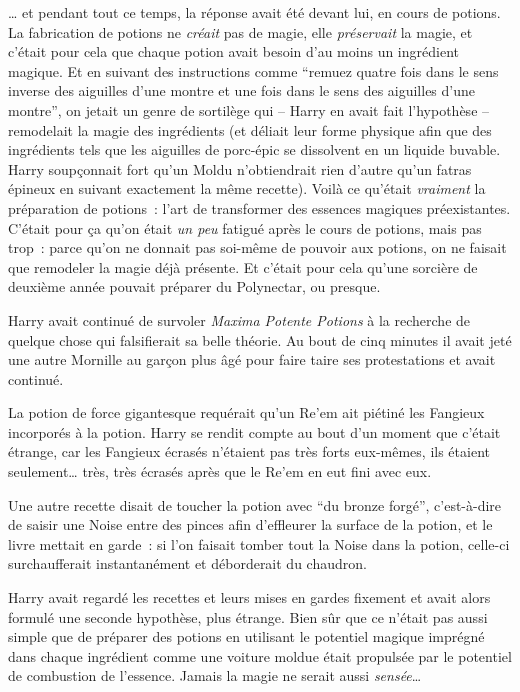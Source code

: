 … et pendant tout ce temps, la réponse avait été devant lui, en cours de potions.
La fabrication de potions ne \emph{créait} pas de magie, elle \emph{préservait} la magie, et c'était pour cela que chaque potion avait besoin d'au moins un ingrédient magique.
Et en suivant des instructions comme “remuez quatre fois dans le sens inverse des aiguilles d'une montre et une fois dans le sens des aiguilles d'une montre”, on jetait un genre de sortilège qui -- Harry en avait fait l'hypothèse -- remodelait la magie des ingrédients (et déliait leur forme physique afin que des ingrédients tels que les aiguilles de porc-épic se dissolvent en un liquide buvable.
Harry soupçonnait fort qu'un Moldu n'obtiendrait rien d'autre qu'un fatras épineux en suivant exactement la même recette).
Voilà ce qu'était \emph{vraiment} la préparation de potions~: l'art de transformer des essences magiques préexistantes.
C'était pour ça qu'on était \emph{un peu} fatigué après le cours de potions, mais pas trop~: parce qu'on ne donnait pas soi-même de pouvoir aux potions, on ne faisait que remodeler la magie déjà présente.
Et c'était pour cela qu'une sorcière de deuxième année pouvait préparer du Polynectar, ou presque.

Harry avait continué de survoler \emph{Maxima Potente Potions} à la recherche de quelque chose qui falsifierait sa belle théorie.
Au bout de cinq minutes il avait jeté une autre Mornille au garçon plus âgé pour faire taire ses protestations et avait continué.

La potion de force gigantesque requérait qu'un Re'em ait piétiné les Fangieux incorporés à la potion.
Harry se rendit compte au bout d'un moment que c'était étrange, car les Fangieux écrasés n'étaient pas très forts eux-mêmes, ils étaient seulement… très, très écrasés après que le Re'em en eut fini avec eux.

Une autre recette disait de toucher la potion avec “du bronze forgé”, c'est-à-dire de saisir une Noise entre des pinces afin d'effleurer la surface de la potion, et le livre mettait en garde~: si l'on faisait tomber tout la Noise dans la potion, celle-ci surchaufferait instantanément et déborderait du chaudron.

Harry avait regardé les recettes et leurs mises en gardes fixement et avait alors formulé une seconde hypothèse, plus étrange.
Bien sûr que ce n'était pas aussi simple que de préparer des potions en utilisant le potentiel magique imprégné dans chaque ingrédient comme une voiture moldue était propulsée par le potentiel de combustion de l'essence.
Jamais la magie ne serait aussi \emph{sensée}…


